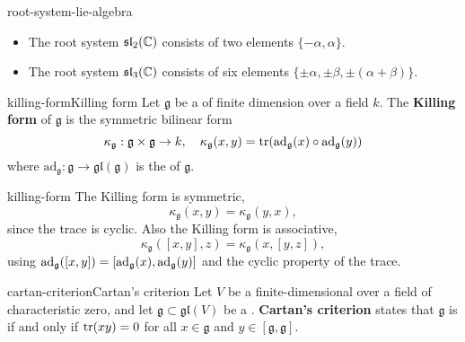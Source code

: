 \begin{example}{root-system-lie-algebra}
    \begin{itemize}
        \item The root system $\mathfrak{sl}_2(\mathbb{C})$ consists of two elements $\{ -\alpha, \alpha \}$.
        \item The root system $\mathfrak{sl}_3(\mathbb{C})$ consists of six elements $\{ \pm \alpha, \pm \beta, \pm (\alpha + \beta) \}$.
    \end{itemize}
\end{example}

\begin{topic}{killing-form}{Killing form}
    Let $\mathfrak{g}$ be a  of finite dimension over a field $k$. The \textbf{Killing form} of $\mathfrak{g}$ is the symmetric bilinear form
    \[ \kappa_\mathfrak{g} : \mathfrak{g} \times \mathfrak{g} \to k, \quad \kappa_\mathfrak{g}(x, y) = \textup{tr}(\textup{ad}_{\mathfrak{g}}(x) \circ \textup{ad}_{\mathfrak{g}}(y)) \]
    where $\text{ad}_\mathfrak{g} : \mathfrak{g} \to \mathfrak{gl}(\mathfrak{g})$ is the  of $\mathfrak{g}$.
\end{topic}

\begin{example}{killing-form}
    The Killing form is symmetric,
    \[ \kappa_\mathfrak{g}(x, y) = \kappa_\mathfrak{g}(y, x) , \]
    since the trace is cyclic. Also the Killing form is associative,
    \[ \kappa_\mathfrak{g}([x, y], z) = \kappa_\mathfrak{g}(x, [y, z]) , \]
    using $\textup{ad}_\mathfrak{g}([x, y]) = [\textup{ad}_\mathfrak{g}(x), \textup{ad}_\mathfrak{g}(y)]$ and the cyclic property of the trace.
\end{example}

\begin{topic}{cartan-criterion}{Cartan's criterion}
    Let $V$ be a finite-dimensional  over a field of characteristic zero, and let $\mathfrak{g} \subset \mathfrak{gl}(V)$ be a . \textbf{Cartan's criterion} states that $\mathfrak{g}$ is  if and only if $\operatorname{tr}(xy) = 0$ for all $x \in \mathfrak{g}$ and $y \in [\mathfrak{g}, \mathfrak{g}]$.
\end{topic}

